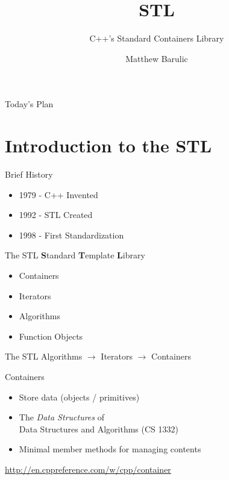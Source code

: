 \documentclass[notes]{beamer}
\author{Matthew Barulic}
\title{STL}
\subtitle{C++'s Standard Containers Library}
\institute{
RoboJackets\\
Spring Training Series\\
Georgia Tech
}
\begin{document}
\begin{frame}
	\titlepage
\end{frame}

\begin{frame}{Today's Plan}

\tableofcontents

	
\end{frame}

\section{Introduction to the STL}

\begin{frame}{Brief History}
	\begin{itemize}
		\item 1979 - C++ Invented
		\item 1992 - STL Created
		\item 1998 - First Standardization
	\end{itemize}
\end{frame}

\begin{frame}{The STL}
	\textbf{S}tandard \textbf{T}emplate \textbf{L}ibrary
	\begin{itemize}
		\item Containers
		\item Iterators
		\item Algorithms
		\item Function Objects
	\end{itemize}
\end{frame}

\begin{frame}{The STL}
	Algorithms $\rightarrow$ Iterators $\rightarrow$ Containers
\end{frame}

\begin{frame}{Containers}
	\begin{itemize}
		\item Store data (objects / primitives)
		\item The \textit{Data Structures} of \\Data Structures and Algorithms (CS 1332)
		\item Minimal member methods for managing contents
	\end{itemize}

	\bigskip

	\begin{center}
		\url{http://en.cppreference.com/w/cpp/container}
	\end{center}
\end{frame}
\end{document}
